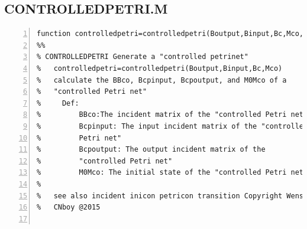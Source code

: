\documentclass[11pt]{article}
\begin{document}
\begin{flushleft}
\section{CONTROLLEDPETRI.M}
\begin{lstlisting}[numbers=left]
function controlledpetri=controlledpetri(Boutput,Binput,Bc,Mco,M0)
%%
% CONTROLLEDPETRI Generate a "controlled petrinet"
%   controlledpetri=controlledpetri(Boutput,Binput,Bc,Mco)
%   calculate the BBco, Bcpinput, Bcpoutput, and M0Mco of a
%   "controlled Petri net"
%     Def:
%         BBco:The incident matrix of the "controlled Petri net"
%         Bcpinput: The input incident matrix of the "controlled
%         Petri net" 
%         Bcpoutput: The output incident matrix of the
%         "controlled Petri net"
%         M0Mco: The initial state of the "controlled Petri net"
% 
%   see also incident inicon petricon transition Copyright Wensen
%   CNboy @2015


\end{lstlisting}
\end{flushleft}
\end{document}
